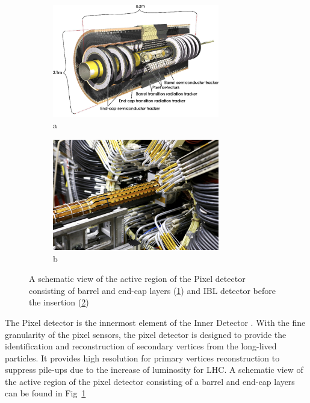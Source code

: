 \begin{figure}[htbp!]
\begin{subfigure}{.5\textwidth}
 \centering
 \includegraphics[width=0.8\textwidth]{chapters/c4/figures/pixel}
 \caption{a}
 \label{fig:pixel1}
\end{subfigure}%
\begin{subfigure}{.5\textwidth}
 \centering
 \includegraphics[width=0.8\textwidth]{chapters/c4/figures/IBL}
 \caption{b}
 \label{fig:pixel2}
\end{subfigure}
 \caption{A schematic view of the active region of the Pixel detector consisting of barrel and end-cap layers (\ref{fig:pixel1}) and IBL detector before the insertion (\ref{fig:pixel2})}
\label{fig:pixel}
\end{figure}
\par The Pixel detector is the innermost element of the Inner Detector \cite{Hirono:2641635}. With the fine granularity of the pixel sensors, 
the pixel detector is designed to provide the identification and reconstruction of secondary vertices from the long-lived particles. It provides high resolution for primary vertices reconstruction to suppress pile-ups due to the increase of luminosity for LHC. A schematic view of the active region of the pixel detector consisting of a barrel and end-cap layers can be found in Fig~\ref{fig:pixel1}
